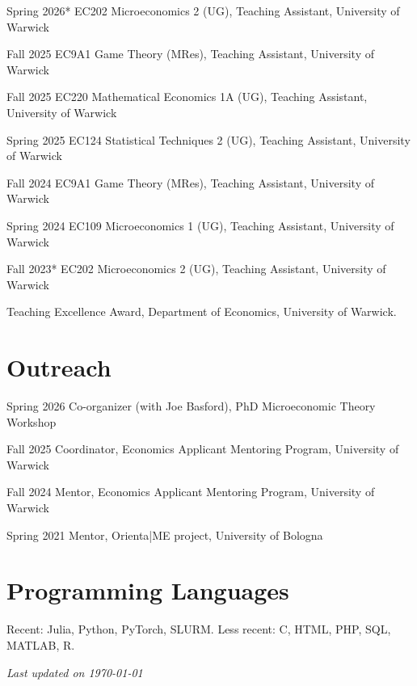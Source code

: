 \documentclass[11pt,a4paper]{article}
\begin{document}
\begin{cvenumerate}
    \item[Spring 2026*] EC202 Microeconomics 2 (UG), Teaching Assistant, University of Warwick %
    \item[Fall 2025] EC9A1 Game Theory (MRes), Teaching Assistant, University of Warwick %
    \item[Fall 2025] EC220 Mathematical Economics 1A (UG), Teaching Assistant, University of Warwick %
    \item[Spring 2025] EC124 Statistical Techniques 2 (UG), Teaching Assistant, University of Warwick %
    \item[Fall 2024] EC9A1 Game Theory (MRes), Teaching Assistant, University of Warwick %
    \item[Spring 2024] EC109 Microeconomics 1 (UG), Teaching Assistant, University of Warwick %
    \item[Fall 2023*] EC202 Microeconomics 2 (UG), Teaching Assistant, University of Warwick %
\end{cvenumerate}
\vspace{-8pt}
{\small*Teaching Excellence Award, Department of Economics, University of Warwick.}


\section{Outreach}

\begin{cvenumerate}
    \item[Spring 2026] Co-organizer (with Joe Basford), PhD Microeconomic Theory Workshop 
    \item[Fall 2025] Coordinator, Economics Applicant Mentoring Program, University of Warwick
    \item[Fall 2024] Mentor, Economics Applicant Mentoring Program, University of Warwick
    \item[Spring 2021] Mentor, Orienta|ME project, University of Bologna
\end{cvenumerate}

\section{Programming Languages}

Recent: Julia, Python, PyTorch, SLURM. Less recent: C, HTML, PHP, SQL, MATLAB, R.

\begin{flushright}
    \textit{Last updated on \today}
\end{flushright}
\end{document}
